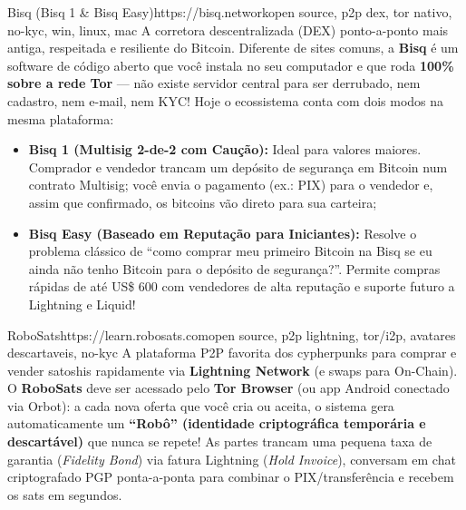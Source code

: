 \documentclass{pousadaguide}
\begin{document}
\begin{ferramenta}[goat,logo=bisq]{Bisq (Bisq 1 \& Bisq Easy)}{https://bisq.network}{open source, p2p dex, tor nativo, no-kyc, win, linux, mac}
A corretora descentralizada (DEX) ponto-a-ponto mais antiga, respeitada e resiliente do Bitcoin. Diferente de sites comuns, a \textbf{Bisq} é um software de código aberto que você instala no seu computador e que roda \textbf{100\% sobre a rede Tor} — não existe servidor central para ser derrubado, nem cadastro, nem e-mail, nem KYC! Hoje o ecossistema conta com dois modos na mesma plataforma:
\begin{itemize}
  \item \textbf{Bisq 1 (Multisig 2-de-2 com Caução):} Ideal para valores maiores. Comprador e vendedor trancam um depósito de segurança em Bitcoin num contrato Multisig; você envia o pagamento (ex.: PIX) para o vendedor e, assim que confirmado, os bitcoins vão direto para sua carteira;
  \item \textbf{Bisq Easy (Baseado em Reputação para Iniciantes):} Resolve o problema clássico de ``como comprar meu primeiro Bitcoin na Bisq se eu ainda não tenho Bitcoin para o depósito de segurança?''. Permite compras rápidas de até US\$ 600 com vendedores de alta reputação e suporte futuro a Lightning e Liquid!
\end{itemize}
\end{ferramenta}

\begin{ferramenta}[goat,logo=robosats]{RoboSats}{https://learn.robosats.com}{open source, p2p lightning, tor/i2p, avatares descartaveis, no-kyc}
A plataforma P2P favorita dos cypherpunks para comprar e vender satoshis rapidamente via \textbf{Lightning Network} (e swaps para On-Chain). O \textbf{RoboSats} deve ser acessado pelo \textbf{Tor Browser} (ou app Android conectado via Orbot): a cada nova oferta que você cria ou aceita, o sistema gera automaticamente um \textbf{“Robô” (identidade criptográfica temporária e descartável)} que nunca se repete! As partes trancam uma pequena taxa de garantia (\emph{Fidelity Bond}) via fatura Lightning (\emph{Hold Invoice}), conversam em chat criptografado PGP ponta-a-ponta para combinar o PIX/transferência e recebem os sats em segundos. 
\end{ferramenta}
\end{document}
